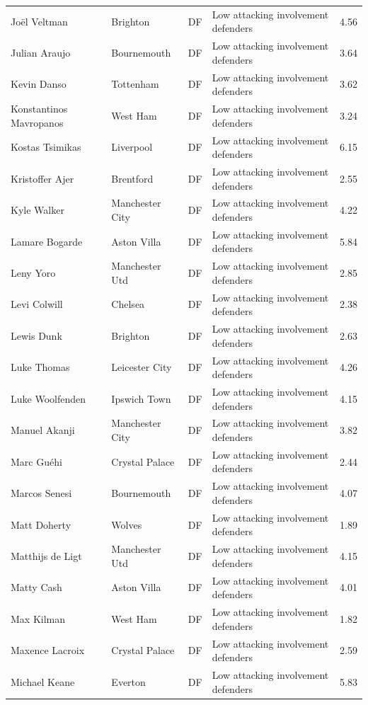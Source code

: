 \begin{longtable}{p{3.4cm}p{2.5cm}p{1.0cm}p{5.0cm}r}
Joël Veltman & Brighton & DF & Low attacking involvement defenders & 4.56 \\
Julian Araujo & Bournemouth & DF & Low attacking involvement defenders & 3.64 \\
Kevin Danso & Tottenham & DF & Low attacking involvement defenders & 3.62 \\
Konstantinos Mavropanos & West Ham & DF & Low attacking involvement defenders & 3.24 \\
Kostas Tsimikas & Liverpool & DF & Low attacking involvement defenders & 6.15 \\
Kristoffer Ajer & Brentford & DF & Low attacking involvement defenders & 2.55 \\
Kyle Walker & Manchester City & DF & Low attacking involvement defenders & 4.22 \\
Lamare Bogarde & Aston Villa & DF & Low attacking involvement defenders & 5.84 \\
Leny Yoro & Manchester Utd & DF & Low attacking involvement defenders & 2.85 \\
Levi Colwill & Chelsea & DF & Low attacking involvement defenders & 2.38 \\
Lewis Dunk & Brighton & DF & Low attacking involvement defenders & 2.63 \\
Luke Thomas & Leicester City & DF & Low attacking involvement defenders & 4.26 \\
Luke Woolfenden & Ipswich Town & DF & Low attacking involvement defenders & 4.15 \\
Manuel Akanji & Manchester City & DF & Low attacking involvement defenders & 3.82 \\
Marc Guéhi & Crystal Palace & DF & Low attacking involvement defenders & 2.44 \\
Marcos Senesi & Bournemouth & DF & Low attacking involvement defenders & 4.07 \\
Matt Doherty & Wolves & DF & Low attacking involvement defenders & 1.89 \\
Matthijs de Ligt & Manchester Utd & DF & Low attacking involvement defenders & 4.15 \\
Matty Cash & Aston Villa & DF & Low attacking involvement defenders & 4.01 \\
Max Kilman & West Ham & DF & Low attacking involvement defenders & 1.82 \\
Maxence Lacroix & Crystal Palace & DF & Low attacking involvement defenders & 2.59 \\
Michael Keane & Everton & DF & Low attacking involvement defenders & 5.83 \\

\end{longtable}
